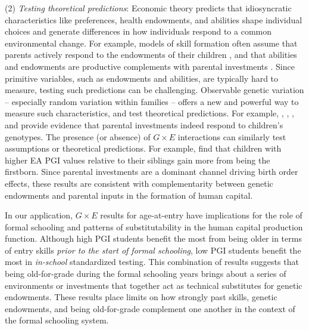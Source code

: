 \documentclass[12pt,a4paper]{article}
\begin{document}
\begin{bibunit}
(2) \textit{Testing theoretical predictions}:  Economic theory predicts that idiosyncratic characteristics like preferences, health endowments, and abilities shape individual choices and generate differences in how individuals respond to a common environmental change.  For example, models of skill formation often assume that parents actively respond to the endowments of their children \citep[e.g.,][]{becker1976child,behrman1997intrahousehold,CURRIE20111315}, and that abilities and endowments are productive complements with parental investments \citep[e.g.,][]{ben1967production,becker1986human,cunha2007technology}. Since primitive variables, such as endowments and abilities, are typically hard to measure, testing such predictions can be challenging. Observable genetic variation -- especially random variation within families --  offers a new and powerful way to measure such characteristics, and test theoretical predictions.  For example, \citet{breinholt2020child}, \citet{fletcher2020production}, \citet{Sanz-de-galdeano2022}, and \citet{houmark2020nurture} provide evidence that parental investments indeed respond to children's genotypes.   The presence (or absence) of $G \times E$ interactions can similarly test assumptions or theoretical predictions. For example, \citet{Muslimova2020b} find that children with higher EA PGI values relative to their siblings gain more from being the firstborn.  Since parental investments are a dominant channel driving birth order effects, these results are consistent with complementarity between genetic endowments and parental inputs in the formation of human capital. 

In our application, $G \times E$ results for age-at-entry have implications for the role of formal schooling and patterns of substitutability in the human capital production function.  Although high PGI students benefit the most from being older in terms of entry skills \textit{prior to the start of formal schooling}, low PGI students benefit the most in \textit{in-school} standardized testing. This combination of results suggests that being old-for-grade during the formal schooling years brings about a series of environments or investments that together act as technical substitutes for genetic endowments. These results place limits on how strongly past skills, genetic endowments, and being old-for-grade complement one another in the context of the formal schooling system.  


\end{bibunit}
\end{document}

